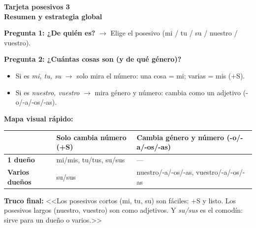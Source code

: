 \documentclass[a4paper,10pt]{article}
\newcommand{\posheader}[2]{%
  \noindent
  \colorbox{moradopos!90}{\parbox{\dimexpr\linewidth-2\fboxsep}{%
    \centering\color{white}\bfseries\large Tarjeta posesivos #1\\[2pt]
    \normalsize #2%
  }}
  \vspace{4pt}
}
\begin{document}
\newpage

\posheader{3}{Resumen y estrategia global}

\vspace{6pt}
\small

\begin{tcolorbox}[colback=moradopos!6, colframe=moradopos!50, boxrule=0.8pt, left=6pt, right=6pt, top=6pt, bottom=6pt, title={\textbf{Dos preguntas para elegir la forma correcta}}, coltitle=white, fonttitle=\bfseries]
\textbf{Pregunta 1: ¿De quién es?} $\to$ Elige el posesivo (mi / tu / su / nuestro / vuestro).

\vspace{4pt}
\textbf{Pregunta 2: ¿Cuántas cosas son (y de qué género)?}
\begin{itemize}[nosep, leftmargin=1.2em]
\item Si es \textit{mi, tu, su} $\to$ solo mira el número: una cosa = mi; varias = mis (+S).
\item Si es \textit{nuestro, vuestro} $\to$ mira género y número: cambia como un adjetivo (-o/-a/-os/-as).
\end{itemize}
\end{tcolorbox}

\vspace{8pt}

\textbf{Mapa visual rápido:}

\vspace{4pt}
\begin{center}
\begin{tabular}{|l|l|l|}
\hline
\rowcolor{moradopos!20}
 & \textbf{Solo cambia número (+S)} & \textbf{Cambia género y número (-o/-a/-os/-as)} \\
\hline
\textbf{1 dueño} & mi/mis, tu/tus, su/sus & --- \\
\hline
\rowcolor{grisclaro}
\textbf{Varios dueños} & su/sus & nuestro/-a/-os/-as, vuestro/-a/-os/-as \\
\hline
\end{tabular}
\end{center}

\vspace{10pt}

\begin{trucoposesivo}
\textbf{Truco final:} <<Los posesivos cortos (mi, tu, su) son fáciles: +S y listo. Los posesivos largos (nuestro, vuestro) son como adjetivos. Y \textit{su/sus} es el comodín: sirve para un dueño o varios.>>
\end{trucoposesivo}
\end{document}
